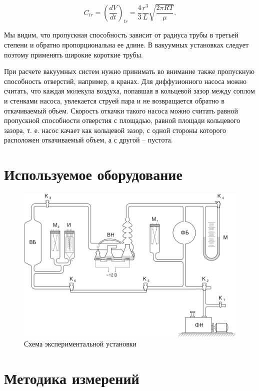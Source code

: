 \documentclass[a4paper,12pt]{article} %
\begin{document}
\begin{equation}
	\label{flow2}
	C_{tr}=(\frac{dV}{dt})_{tr}=\frac{4}{3}\frac{r^3}{L}\sqrt{\frac{2\pi RT}{\mu}}.
\end{equation}

Мы видим, что пропускная способность зависит от радиуса трубы в третьей степени и обратно пропорциональна ее длине. В вакуумных установках следует поэтому применять широкие короткие  трубы.

При расчете вакуумных систем нужно принимать во внимание также пропускную способность отверстий, например, в кранах. Для диффузионного насоса можно считать, что каждая молекула воздуха, попавшая в кольцевой зазор между соплом и стенками насоса, увлекается струей пара и не возвращается обратно в откачиваемый объем. Скорость откачки такого насоса можно считать равной пропускной способности отверстия с площадью, равной площади кольцевого зазора, т. е. насос качает как кольцевой зазор, с одной стороны которого расположен откачиваемый объем, а с другой -- пустота.

\newpage

\section{Используемое оборудование}

\begin{figure}[h!]
    \centering
    \includegraphics[width=\textwidth]{установка.png}
    \caption{Схема экспериментальной установки}\label{setup}
\end{figure}

\FloatBarrier

\section{Методика измерений}
\end{document}

